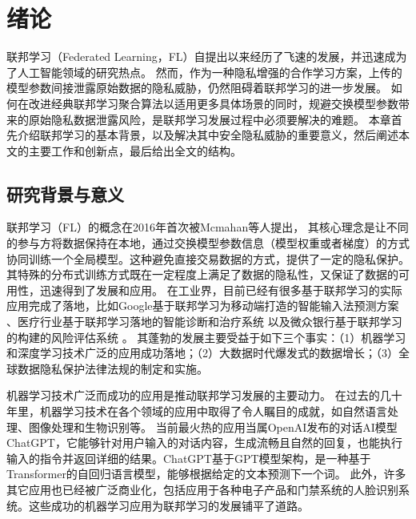 \chapter{绪论}
联邦学习（Federated Learning，FL）自提出以来经历了飞速的发展，并迅速成为了人工智能领域的研究热点。
然而，作为一种隐私增强的合作学习方案，上传的模型参数间接泄露原始数据的隐私威胁，仍然阻碍着联邦学习的进一步发展。
如何在改进经典联邦学习聚合算法以适用更多具体场景的同时，规避交换模型参数带来的原始隐私数据泄露风险，是联邦学习发展过程中必须要解决的难题。
本章首先介绍联邦学习的基本背景，以及解决其中安全隐私威胁的重要意义，然后阐述本文的主要工作和创新点，最后给出全文的结构。

\section{研究背景与意义} 
联邦学习（FL）的概念在2016年首次被Mcmahan等人\cite{mcmahan2017communication}提出，
其核心理念是让不同的参与方将数据保持在本地，通过交换模型参数信息（模型权重或者梯度）的方式协同训练一个全局模型。这种避免直接交易数据的方式，提供了一定的隐私保护。
其特殊的分布式训练方式既在一定程度上满足了数据的隐私性，又保证了数据的可用性，迅速得到了发展和应用\cite{bhagoji2019analyzing}。
在工业界，目前已经有很多基于联邦学习的实际应用完成了落地，比如Google基于联邦学习为移动端打造的智能输入法预测方案 \cite{hard2018federated}、医疗行业基于联邦学习落地的智能诊断和治疗系统 \cite{li2020deepfed}以及微众银行基于联邦学习的构建的风险评估系统 \cite{DBLP:conf/ndss/CaoF0G21}。
其蓬勃的发展主要受益于如下三个事实：（1）机器学习和深度学习技术广泛的应用成功落地；（2）大数据时代爆发式的数据增长；（3）全球数据隐私保护法律法规的制定和实施。

机器学习技术广泛而成功的应用是推动联邦学习发展的主要动力。
在过去的几十年里，机器学习技术在各个领域的应用中取得了令人瞩目的成就，如自然语言处理\cite{devlin2018bert}、图像处理\cite{zhu2020neural}和生物识别\cite{yin20193d}等。
当前最火热的应用当属OpenAI发布的对话AI模型ChatGPT，它能够针对用户输入的对话内容，生成流畅且自然的回复，也能执行输入的指令并返回详细的结果。ChatGPT基于GPT模型架构\cite{brown2020language, chen2023gpt4}，是一种基于Transformer的自回归语言模型，能够根据给定的文本预测下一个词。
此外，许多其它应用也已经被广泛商业化，包括应用于各种电子产品和门禁系统的人脸识别系统。这些成功的机器学习应用为联邦学习的发展铺平了道路。

